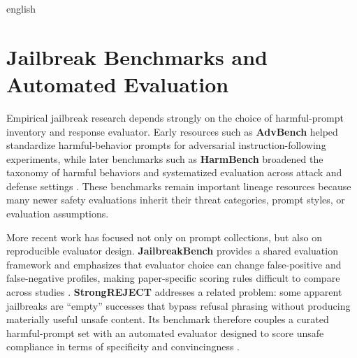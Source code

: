 \begin{otherlanguage*}{english}
\begin{landscape}
\begin{table}[h]
\par{}


\end{table}



\end{landscape}

\newpage

\section{Jailbreak Benchmarks and Automated Evaluation}
\label{sec:jailbreak-benchmarks-review}

Empirical jailbreak research depends strongly on the choice of harmful-prompt inventory and response evaluator. Early resources such as \textbf{AdvBench} helped standardize harmful-behavior prompts for adversarial instruction-following experiments, while later benchmarks such as \textbf{HarmBench} broadened the taxonomy of harmful behaviors and systematized evaluation across attack and defense settings \cite{Zou2023Universal,mazeikaHarmBench2024}. These benchmarks remain important lineage resources because many newer safety evaluations inherit their threat categories, prompt styles, or evaluation assumptions.

More recent work has focused not only on prompt collections, but also on reproducible evaluator design. \textbf{JailbreakBench} provides a shared evaluation framework and emphasizes that evaluator choice can change false-positive and false-negative profiles, making paper-specific scoring rules difficult to compare across studies \cite{chaoJailbreakBenchOpenRobustness2025}. \textbf{StrongREJECT} addresses a related problem: some apparent jailbreaks are ``empty'' successes that bypass refusal phrasing without producing materially useful unsafe content. Its benchmark therefore couples a curated harmful-prompt set with an automated evaluator designed to score unsafe compliance in terms of specificity and convincingness \cite{soulyStrongREJECT2024}.


\end{otherlanguage*}
